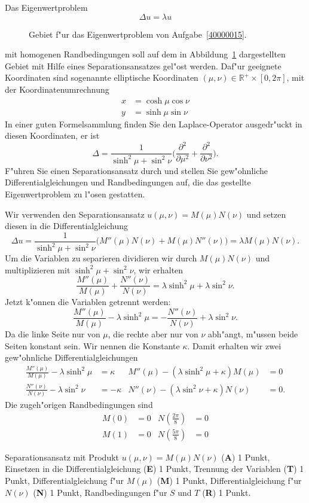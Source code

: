 Das Eigenwertproblem 
\[
\Delta u = \lambda u
\]
\begin{figure}
\centering
{}
\caption{Gebiet f"ur das Eigenwertproblem von Aufgabe~\ref{40000015}.
\label{40000015:gebiet}}
\end{figure}%
mit homogenen Randbedingungen soll auf dem in Abbildung~\ref{40000015:gebiet}
dargestellten Gebiet
mit Hilfe eines Separationsansatzes gel"ost werden.
Daf"ur geeignete Koordinaten sind sogenannte elliptische Koordinaten
$(\mu,\nu)\in \mathbb R^+\times [0,2\pi]$, mit der Koordinatenumrechnung
\begin{align*}
x&=\cosh\mu\cos\nu
\\
y&=\sinh\mu\sin\nu
\end{align*}
In einer guten Formelsammlung finden Sie den Laplace-Operator ausgedr"uckt
in diesen Koordinaten, er ist
\[
\Delta
=
\frac1{\sinh^2\mu+\sin^2\nu}
\biggl(
\frac{\partial^2}{\partial \mu^2}+\frac{\partial^2}{\partial\nu^2}
\biggr).
\]
F"uhren Sie einen Separationsansatz durch und stellen Sie gew"ohnliche
Differentialgleichungen und Randbedingungen auf, die das gestellte
Eigenwertproblem zu l"osen gestatten.

\begin{loesung}
Wir verwenden den Separationsansatz $u(\mu,\nu)=M(\mu)N(\nu)$ und
setzen diesen in die Differentialgleichung
\[
\Delta u
=
\frac1{\sinh^2\mu+\sin^2\nu}
\biggl(
M''(\mu)N(\nu) + M(\mu)N''(\nu)
\biggr)
=
\lambda M(\mu)N(\nu).
\]
Um die Variablen zu separieren dividieren wir durch $M(\mu)N(\nu)$
und multiplizieren mit $\sinh^2\mu+\sin^2\nu$, wir erhalten
\[
\frac{M''(\mu)}{M(\mu)}
+
\frac{N''(\nu)}{N(\nu)}
=
\lambda\sinh^2\mu + \lambda \sin^2\nu.
\]
Jetzt k"onnen die Variablen getrennt werden:
\[
\frac{M''(\mu)}{M(\mu)}-\lambda\sinh^2\mu
=
-\frac{N''(\nu)}{N(\nu)}+\lambda\sin^2\nu.
\]
Da die linke Seite nur von $\mu$, die rechte aber nur von $\nu$ abh"angt,
m"ussen beide Seiten konstant sein.
Wir nennen die Konstante $\kappa$.
Damit erhalten wir zwei gew"ohnliche Differentialgleichungen
\begin{align*}
\frac{M''(\mu)}{M(\mu)}-\lambda\sinh^2\mu &=  \kappa
&
M''(\mu)-(\lambda\sinh^2\mu+\kappa)M(\mu)&=0
\\
\frac{N''(\nu)}{N(\nu)}-\lambda\sin^2\nu &= -\kappa
&
N''(\nu)-(\lambda\sin^2\nu+\kappa)N(\nu)&=0.
\end{align*}
Die zugeh"origen Randbedingungen sind
\begin{align*}
M(0)&=0&
N({\textstyle\frac{2\pi}{8}})&=0
\\
M(1)&=0&
N({\textstyle\frac{5\pi}{8}})&=0
\end{align*}
\end{loesung}

\begin{bewertung}
Separationsansatz mit Produkt $u(\mu,\nu) = M(\mu)N(\nu)$ ({\bf A}) 1 Punkt,
Einsetzen in die Differentialgleichung ({\bf E}) 1 Punkt,
Trennung der Variablen ({\bf T}) 1 Punkt,
Differentialgleichung f"ur $M(\mu)$ ({\bf M}) 1 Punkt,
Differentialgleichung f"ur $N(\nu)$ ({\bf N}) 1 Punkt,
Randbedingungen f"ur $S$ und $T$ ({\bf R}) 1 Punkt.
\end{bewertung}

